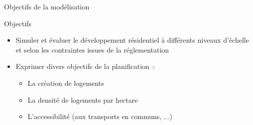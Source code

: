 \documentclass[xcolor=table]{beamer}
\begin{document}
\begin{frame}{Objectifs de la modélisation}
		\begin{block}{Objectifs}
		\begin{itemize}
		\vspace{-0.2cm}
			\small
			\item<1-> Simuler et évaluer le développement résidentiel à différents niveaux d'échelle et selon les contraintes issues de la réglementation
	
			\item<2-> Exprimer divers objectifs de la planification~: %
			\begin{itemize}
				\scriptsize
				\item<3-> La création de logements
				\item<4-> La densité de logements par hectare
				\item<5-> L'accessibilité (aux transports en communs, ...)
			\end{itemize}
		\end{itemize}
	\end{block}
	\vspace{-0.5cm}
	\vspace{-0.5cm}
\end{frame}
\end{document}
